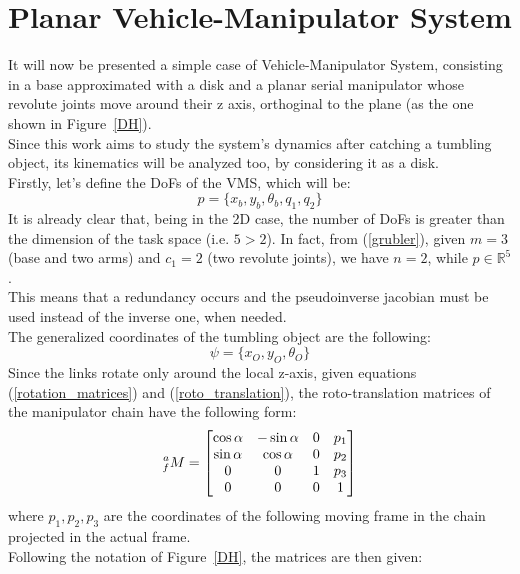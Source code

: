 \documentclass[a4paper,12pt,oneside]{report}
\begin{document}
\section{Planar Vehicle-Manipulator System}\label{planar_VMS}
It will now be presented a simple case of Vehicle-Manipulator System, consisting in a base approximated with a disk and a planar serial manipulator whose revolute joints move around their z axis, orthoginal to the plane (as the one shown in Figure~\ref{DH}).\\
Since this work aims to study the system's dynamics after catching a tumbling object, its kinematics will be analyzed too, by considering it as a disk.\\
Firstly, let's define the DoFs of the VMS, which will be:
\begin{equation}
  p=\{x_b,y_b,\theta_b,q_1,q_2\}
\end{equation}
It is already clear that, being in the 2D case, the number of DoFs is greater than the dimension of the task space (i.e. $5>2$). In fact, from (\ref{grubler}), given $m=3$ (base and two arms) and $c_1=2$ (two revolute joints), we have $n=2$, while $p\in\mathbb{R} ^5$.\\ 
This means that a redundancy occurs and the pseudoinverse jacobian must be used instead of the inverse one, when needed.\\
The generalized coordinates of the tumbling object are the following:
\begin{equation}
  \psi=\{x_O,y_O,\theta_O\}
  \label{object_coordinates}
\end{equation}
Since the links rotate only around the local z-axis, given equations (\ref{rotation_matrices}) and (\ref{roto_translation}), the roto-translation matrices of the manipulator chain have the following form:
\begin{equation}
  \prescript{a}{f}{M}=
  \begin{bmatrix}
    \cos{\alpha}&-\sin{\alpha}&0&p_1\\
    \sin{\alpha}&\cos{\alpha}&0&p_2\\
    0&0&1&p_3\\
    0&0&0&1
  \end{bmatrix}
\end{equation}
where $p_1,p_2,p_3$ are the coordinates of the following moving frame in the chain projected in the actual frame.\\
Following the notation of Figure~\ref{DH}, the matrices are then given:
\end{document}
